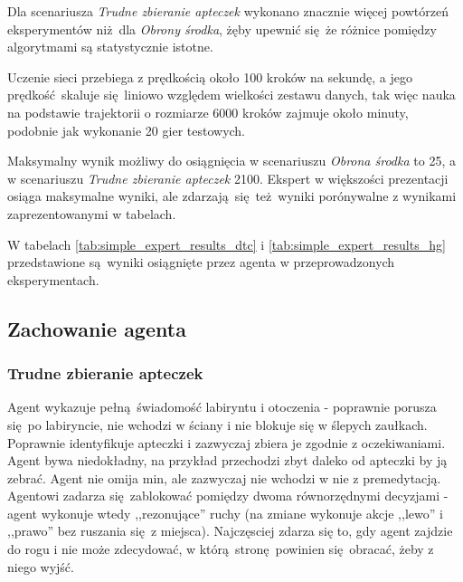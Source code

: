 Dla scenariusza \textit{Trudne zbieranie apteczek} wykonano znacznie więcej powtórzeń eksperymentów niż dla \textit{Obrony środka}, żęby upewnić się że różnice pomiędzy algorytmami są statystycznie istotne.

Uczenie sieci przebiega z prędkością około 100 kroków na sekundę, a jego prędkość skaluje się liniowo względem wielkości zestawu danych, tak więc nauka na podstawie trajektorii o rozmiarze 6000 kroków zajmuje około minuty, podobnie jak wykonanie 20 gier testowych.

Maksymalny wynik możliwy do osiągnięcia w scenariuszu \textit{Obrona środka} to 25, a w scenariuszu \textit{Trudne zbieranie apteczek} 2100. Ekspert w większości prezentacji osiąga maksymalne wyniki, ale zdarzają się też wyniki porónywalne z wynikami zaprezentowanymi w tabelach.

W tabelach \ref{tab:simple_expert_results_dtc} i \ref{tab:simple_expert_results_hg} przedstawione są wyniki osiągnięte przez agenta w przeprowadzonych eksperymentach.


\begin{figure}[H]
\end{figure}

\begin{figure}[H]
\end{figure}

\subsection{Zachowanie agenta}
\subsubsection{Trudne zbieranie apteczek}
Agent wykazuje pełną świadomość labiryntu i otoczenia - poprawnie porusza się po labiryncie, nie wchodzi w ściany i nie blokuje się w ślepych zaułkach. Poprawnie identyfikuje apteczki i zazwyczaj zbiera je zgodnie z oczekiwaniami. Agent bywa niedokładny, na przykład przechodzi zbyt daleko od apteczki by ją zebrać. Agent nie omija min, ale zazwyczaj nie wchodzi w nie z premedytacją. Agentowi zadarza się zablokować pomiędzy dwoma równorzędnymi decyzjami - agent wykonuje wtedy ,,rezonujące'' ruchy (na zmiane wykonuje akcje ,,lewo'' i ,,prawo'' bez ruszania się z miejsca). Najczęsciej zdarza się to, gdy agent zajdzie do rogu i nie może zdecydować, w którą stronę powinien się obracać, żeby z niego wyjść.

